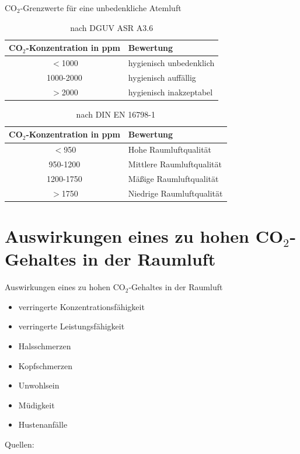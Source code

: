 \documentclass[10pt,ngerman]{beamer}
\begin{document}
\begin{frame}[fragile]{CO$_2$-Grenzwerte für eine unbedenkliche Atemluft}
  \begin{table}
    \caption{nach DGUV ASR A3.6 \autocite{ASR}}
    \begin{tabular}{ |c|p{}|}
      \hline
      CO$_2$-Konzentration in ppm & Bewertung               \\ \hline
      $<$1000                     & hygienisch unbedenklich \\ \hline
      1000-2000                   & hygienisch auffällig    \\ \hline
      $>$2000                     & hygienisch inakzeptabel \\ \hline
    \end{tabular}
  \end{table}
  \begin{table}
    \caption{nach DIN EN 16798-1 \autocite{din_en_16798}}
    \begin{tabular}{|c|p{}|}
      \hline
      CO$_2$-Konzentration in ppm & Bewertung                 \\ \hline
      $<$950                      & Hohe Raumluftqualität     \\ \hline
      950-1200                    & Mittlere Raumluftqualität \\ \hline
      1200-1750                   & Mäßige Raumluftqualität   \\ \hline
      $>$1750                     & Niedrige Raumluftqualität \\ \hline
    \end{tabular}
  \end{table}
\end{frame}

\section{Auswirkungen eines zu hohen CO$_2$-Gehaltes in der Raumluft}
\begin{frame}[fragile]{Auswirkungen eines zu hohen CO$_2$-Gehaltes in der Raumluft}
  \begin{itemize}
    \item verringerte Konzentrationsfähigkeit
    \item verringerte Leistungsfähigkeit
    \item Halsschmerzen
    \item Kopfschmerzen
    \item Unwohlsein
    \item Müdigkeit
    \item Hustenanfälle
  \end{itemize}

  Quellen: \autocite{umweltbundesamt} \autocite{din_en_16798} \autocite{ASR} \autocite{kajtar} \autocite{zhang} \autocite{myhrvold} \autocite{tiesler}
\end{frame}
\end{document}
